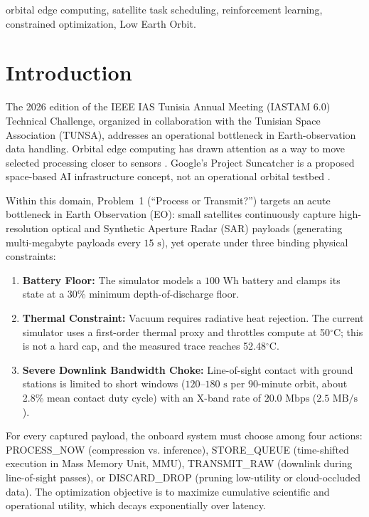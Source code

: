 \documentclass[conference]{IEEEtran}
\begin{document}
\begin{IEEEkeywords}
orbital edge computing, satellite task scheduling, reinforcement learning, constrained optimization, Low Earth Orbit.
\end{IEEEkeywords}

\section{Introduction}
The 2026 edition of the IEEE IAS Tunisia Annual Meeting (IASTAM 6.0) Technical Challenge, organized in collaboration with the Tunisian Space Association (TUNSA), addresses an operational bottleneck in Earth-observation data handling. Orbital edge computing has drawn attention as a way to move selected processing closer to sensors \cite{denby2020orbital, suncatcher2025}. Google's Project Suncatcher is a proposed space-based AI infrastructure concept, not an operational orbital testbed \cite{suncatcher2025}.

Within this domain, Problem~1 (``Process or Transmit?'') targets an acute bottleneck in Earth Observation (EO): small satellites continuously capture high-resolution optical and Synthetic Aperture Radar (SAR) payloads (generating multi-megabyte payloads every $15\text{ s}$), yet operate under three binding physical constraints:
\begin{enumerate}
    \item \textbf{Battery Floor:} The simulator models a $100\text{ Wh}$ battery and clamps its state at a 30\% minimum depth-of-discharge floor.
    \item \textbf{Thermal Constraint:} Vacuum requires radiative heat rejection. The current simulator uses a first-order thermal proxy and throttles compute at 50$^\circ$C; this is not a hard cap, and the measured trace reaches 52.48$^\circ$C.
    \item \textbf{Severe Downlink Bandwidth Choke:} Line-of-sight contact with ground stations is limited to short windows ($120\text{--}180\text{ s}$ per 90-minute orbit, about 2.8\% mean contact duty cycle) with an X-band rate of $20.0\text{ Mbps}$ ($2.5\text{ MB/s}$).
\end{enumerate}

For every captured payload, the onboard system must choose among four actions: PROCESS\_NOW (compression vs. inference), STORE\_QUEUE (time-shifted execution in Mass Memory Unit, MMU), TRANSMIT\_RAW (downlink during line-of-sight passes), or DISCARD\_DROP (pruning low-utility or cloud-occluded data). The optimization objective is to maximize cumulative scientific and operational utility, which decays exponentially over latency.
\end{document}
